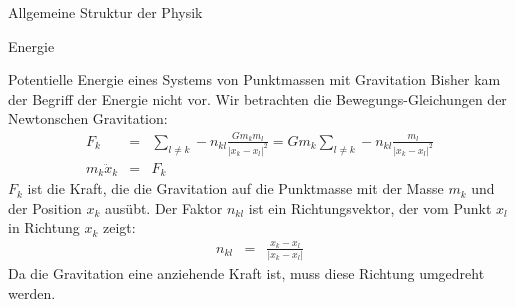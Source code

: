 \def\titlestr{Allgemeine Struktur der Physik}
\ifx\makebook\undefined
	
\else
	\begin{chapter}{\titlestr}
\fi
\begin{section}{Energie}
\begin{subsection}{Potentielle Energie eines Systems von Punktmassen mit Gravitation}
Bisher kam der Begriff der Energie nicht vor. Wir betrachten die Bewegungs-Gleichungen
der Newtonschen Gravitation:
\begin{eqnarray*}
F_k &=& \sum_{l\ne k} -n_{kl}\frac{Gm_km_l}{|x_k-x_l|^2}=Gm_k\sum_{l\ne k} -n_{kl}\frac{m_l}{|x_k-x_l|^2}\\
m_k\ddot{x}_k &=& F_k
\end{eqnarray*}
$F_k$ ist die Kraft, die die Gravitation auf die Punktmasse mit der Masse $m_k$ und der Position $x_k$ ausübt.
Der Faktor $n_{kl}$ ist ein Richtungsvektor, der vom Punkt $x_l$ in Richtung $x_k$ zeigt:
\begin{eqnarray*}
n_{kl} &=& \frac{x_k-x_l}{|x_k-x_l|}
\end{eqnarray*}
Da die Gravitation eine anziehende Kraft ist, muss diese Richtung umgedreht werden.


\end{subsection}
\end{section}
\end{chapter}
